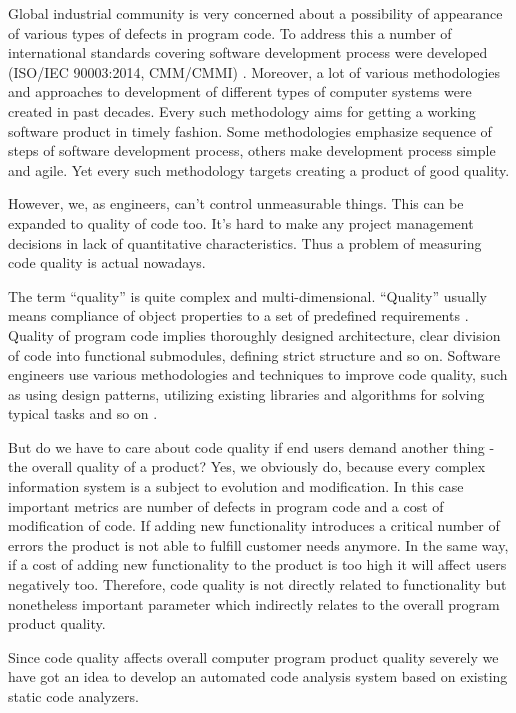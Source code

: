 \documentclass[runningheads,a4paper]{llncs}
\begin{document}
Global industrial community is very concerned about a possibility of appearance
of various types of defects in program code. To address this a number of
international standards covering software development process
were developed (ISO/IEC 90003:2014, CMM/CMMI) \cite{item02}. Moreover, a lot of
various methodologies and approaches to development of different types
of computer systems were created in past decades. Every such methodology aims
for getting a working software product in timely fashion. Some methodologies
emphasize sequence of steps of software development process, others make
development process simple and agile. Yet every such methodology targets
creating a product of good quality.

However, we, as engineers, can’t control unmeasurable things. This can be
expanded to quality of code too. It’s hard to make any project management
decisions in lack of quantitative characteristics. Thus a problem of measuring
code quality is actual nowadays.

The term “quality” is quite complex and multi-dimensional. “Quality” usually
means compliance of object properties to a set of predefined requirements \cite{item03}.
Quality of program code implies thoroughly designed architecture, clear division
of code into functional submodules, defining strict structure and so on.
Software engineers use various methodologies and techniques to improve code
quality, such as using design patterns, utilizing existing libraries and
algorithms for solving typical tasks and so on \cite{item04}.

But do we have to care about code quality if end users demand another
thing - the overall quality of a product? Yes, we obviously do, because every
complex information system is a subject to evolution and modification. In this
case important metrics are number of defects in program code and a cost of
modification of code. If adding new functionality introduces a critical number
of errors the product is not able to fulfill customer needs anymore. In the
same way, if a cost of adding new functionality to the product is too high
it will affect users negatively too. Therefore, code quality is not directly
related to functionality but nonetheless important parameter which indirectly
relates to the overall program product quality.

Since code quality affects overall computer program product quality severely
we have got an idea to develop an automated code analysis system based on
existing static code analyzers.
\end{document}
